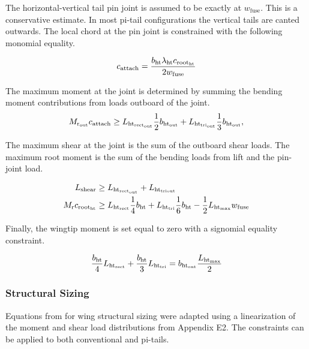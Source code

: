 The horizontal-vertical tail pin joint is assumed to be exactly at $w_{\textrm{fuse}}$. 
This is a conservative estimate. In most pi-tail configurations the vertical 
tails are canted outwards. The local chord at the pin joint is constrained with 
the following monomial equality.
 
\begin{equation}
    c_{\rm{attach}} = \frac{b_{\rm{ht}} \lambda_{\rm{ht}} c_{\rm{root}_{\rm{ht}}}}{2 w_{\textrm{fuse}}}
\end{equation}
 
The maximum moment at the joint is determined by summing the bending moment 
contributions from loads outboard of the joint. 
\begin{equation}
M_{\rm{r}_{\rm{out}}} c_{\rm{attach}} \geq 
                    L_{\rm{ht}_{\rm{rect}_{\rm{out}}}} \frac{1}{2}b_{\rm{ht}_{\rm{out}}} + 
L_{\rm{ht}_{tri_{\rm{out}}}} \frac{1}{3}b_{\rm{ht}_{\rm{out}}},
\end{equation}
 
The maximum shear at the joint is the sum of the outboard shear loads. The 
maximum root moment is the sum of the bending loads from lift and the pin-joint 
load. 
 
\begin{align}
L_{\rm{shear}} &\geq L_{\rm{ht}_{\rm{rect}_{\rm{out}}}} + L_{\rm{ht}_{tri{\rm{out}}}}\\
M_{\rm{r}} c_{\rm{root}_{\rm{ht}}} &\geq L_{\rm{ht}_{\rm{rect}}} \frac{1}{4}b_{\rm{ht}} + L_{\rm{ht}_{\rm{\rm{tri}}}} 
\frac{1}{6}b_{\rm{ht}}  - \frac{1}{2}L_{\rm{ht}_{\rm{max}}} w_{\textrm{fuse}} 
\end{align}

Finally, the wingtip moment is set equal to zero with a signomial equality 
constraint.

\begin{equation}
    \frac{b_{\rm{ht}}}{4} L_{\rm{ht}_{\rm{rect}}} + \frac{b_{\rm{ht}}}{3} L_{\rm{ht}_{\rm{\rm{tri}}}} = b_{\rm{ht}_{\rm{out}}} 
\frac{L_{\rm{ht}_{\rm{max}}}}{2}
\end{equation}

\subsubsection{Structural Sizing}

Equations from \cite{gp_ac_design} for wing structural sizing were adapted using 
a linearization of the moment and shear load distributions from Appendix E2. The 
constraints can be applied to both conventional and pi-tails.

